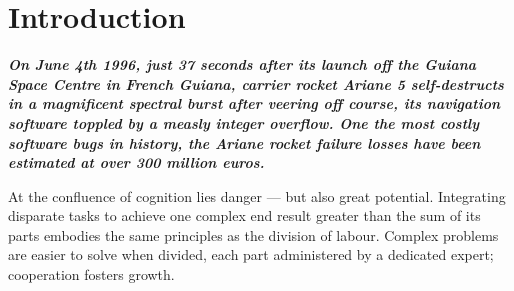 \documentclass[12pt,a4paper,oneside,pdftex]{report}
\begin{document}
\label{pages-prelude}
\cleardoublepage

\startfirstchapter

\pagestyle{headings}


% 
\chapter{Introduction}
\label{chapter:introduction}


\begin{adjustwidth}{2.5em}{0pt}
\small
\textbf{\emph{On June 4th 1996, just 37 seconds after its launch off the Guiana Space Centre in French Guiana, carrier rocket Ariane 5 self-destructs in a magnificent spectral burst after veering off course, its navigation software toppled by a measly integer overflow. One the most costly software bugs in history, the Ariane rocket failure losses have been estimated at over 300 million euros. \citep{dowson1997ariane}}}
\normal
\end{adjustwidth}
\vspace{8 mm}

At the confluence of cognition lies danger --- but also great potential. Integrating disparate tasks to achieve one complex end result greater than the sum of its parts embodies the same principles as the division of labour. Complex problems are easier to solve when divided, each part administered by a dedicated expert; cooperation fosters growth. 
\end{document}
